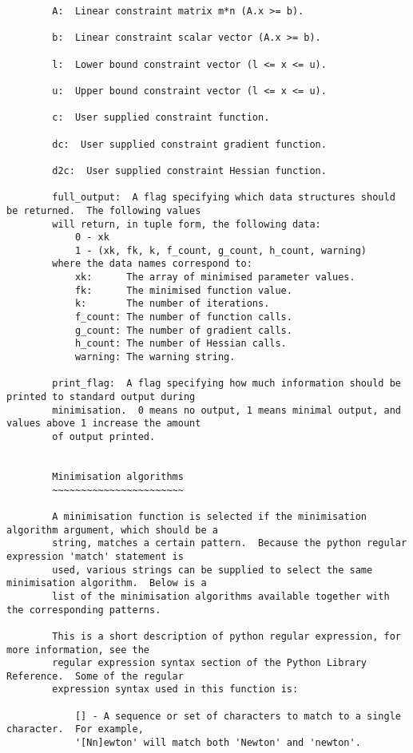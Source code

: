 \begin{verbatim}
        A:  Linear constraint matrix m*n (A.x >= b).
    
        b:  Linear constraint scalar vector (A.x >= b).
    
        l:  Lower bound constraint vector (l <= x <= u).
    
        u:  Upper bound constraint vector (l <= x <= u).
    
        c:  User supplied constraint function.
    
        dc:  User supplied constraint gradient function.
    
        d2c:  User supplied constraint Hessian function.
    
        full_output:  A flag specifying which data structures should be returned.  The following values
        will return, in tuple form, the following data:
            0 - xk
            1 - (xk, fk, k, f_count, g_count, h_count, warning)
        where the data names correspond to:
            xk:      The array of minimised parameter values.
            fk:      The minimised function value.
            k:       The number of iterations.
            f_count: The number of function calls.
            g_count: The number of gradient calls.
            h_count: The number of Hessian calls.
            warning: The warning string.
    
        print_flag:  A flag specifying how much information should be printed to standard output during
        minimisation.  0 means no output, 1 means minimal output, and values above 1 increase the amount
        of output printed.
    
    
        Minimisation algorithms
        ~~~~~~~~~~~~~~~~~~~~~~~
    
        A minimisation function is selected if the minimisation algorithm argument, which should be a
        string, matches a certain pattern.  Because the python regular expression 'match' statement is
        used, various strings can be supplied to select the same minimisation algorithm.  Below is a
        list of the minimisation algorithms available together with the corresponding patterns.
    
        This is a short description of python regular expression, for more information, see the
        regular expression syntax section of the Python Library Reference.  Some of the regular
        expression syntax used in this function is:
    
            [] - A sequence or set of characters to match to a single character.  For example,
            '[Nn]ewton' will match both 'Newton' and 'newton'.
    

\end{verbatim}
